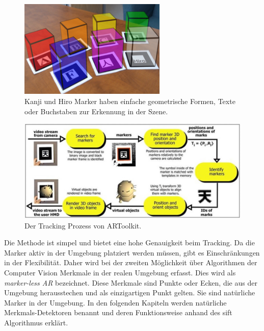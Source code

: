 \begin{figure}[H]
    \centering
    \includegraphics[width=7cm]{img/tracking/kanjo-hiro-marker.png}
    \caption[Kanji und Hiro Marker haben einfache geometrische Formen, Texte oder Buchstaben zur Erkennung in der Szene.]{Kanji und Hiro Marker haben einfache geometrische Formen, Texte oder Buchstaben zur Erkennung in der Szene\protect\footnotemark.}
    \label{fig: tracking_kanji_hiro}
\end{figure}
\begin{figure}[H]
    \centering
    \includegraphics[width=\textwidth]{img/tracking/tracking-ARToolkit.jpg}
    \caption{Der Tracking Prozess von ARToolkit\cite*[Billinghurst(2015),][]{billinghurst2015}.}
    \label{fig: tracking_ARToolkit}
\end{figure}

Die Methode ist simpel und bietet eine hohe Genauigkeit beim Tracking. Da die Marker aktiv in der Umgebung platziert werden müssen, gibt es Einschränkungen in der Flexibilität. Daher wird bei der zweiten Möglichkeit über Algorithmen der Computer Vision Merkmale in der realen Umgebung erfasst. Dies wird als \textit{marker-less AR} bezeichnet. Diese Merkmale sind Punkte oder Ecken, die aus der Umgebung herausstechen und als einzigartigen Punkt gelten. Sie sind natürliche Marker in der Umgebung. In den folgenden Kapiteln werden natürliche Merkmals-Detektoren benannt und deren Funktionsweise anhand des \acrfull{sift} Algorithmus erklärt.

